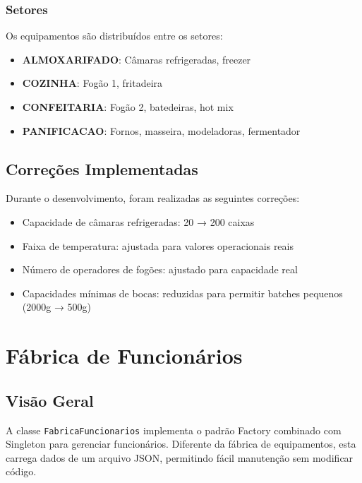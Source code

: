 \documentclass[11pt,a4paper]{article}
\begin{document}
\subsubsection{Setores}

Os equipamentos são distribuídos entre os setores:

\begin{itemize}
    \item \textbf{ALMOXARIFADO}: Câmaras refrigeradas, freezer
    \item \textbf{COZINHA}: Fogão 1, fritadeira
    \item \textbf{CONFEITARIA}: Fogão 2, batedeiras, hot mix
    \item \textbf{PANIFICACAO}: Fornos, masseira, modeladoras, fermentador
\end{itemize}

\subsection{Correções Implementadas}

Durante o desenvolvimento, foram realizadas as seguintes correções:

\begin{itemize}
    \item Capacidade de câmaras refrigeradas: 20 → 200 caixas
    \item Faixa de temperatura: ajustada para valores operacionais reais
    \item Número de operadores de fogões: ajustado para capacidade real
    \item Capacidades mínimas de bocas: reduzidas para permitir batches pequenos (2000g → 500g)
\end{itemize}

\newpage

\section{Fábrica de Funcionários}

\subsection{Visão Geral}

A classe \texttt{FabricaFuncionarios} implementa o padrão Factory combinado com Singleton para gerenciar funcionários. Diferente da fábrica de equipamentos, esta carrega dados de um arquivo JSON, permitindo fácil manutenção sem modificar código.
\end{document}
